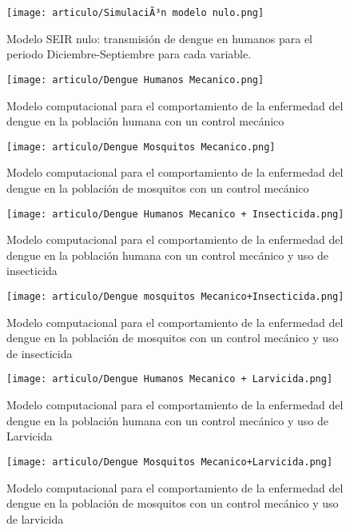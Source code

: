 \documentclass[journal]{IEEEtran}
\begin{document}

\begin{figure}[H]
\centering
\texttt{[image: articulo/SimulaciÃ³n modelo nulo.png]}
\caption{Modelo SEIR nulo: transmisión de dengue en humanos para el periodo Diciembre-Septiembre para cada variable.}
\label{fig:resultado1}
\centering
\end{figure}



\begin{figure}[h]
\texttt{[image: articulo/Dengue Humanos Mecanico.png]}
\centering 
\caption{Modelo computacional para el comportamiento de la enfermedad del dengue en la población humana con un control mecánico}
\label{3J}
\end{figure}
\begin{figure}[h]
\texttt{[image: articulo/Dengue Mosquitos Mecanico.png]}
\centering 
\caption{Modelo computacional para el comportamiento de la enfermedad del dengue en la población de mosquitos con un control mecánico}
\label{4J}
\end{figure}
\begin{figure}[h]
\texttt{[image: articulo/Dengue Humanos Mecanico + Insecticida.png]}
\centering 
\caption{Modelo computacional para el comportamiento de la enfermedad del dengue en la población humana con un control mecánico y uso de insecticida}
\label{5J}
\end{figure}
\begin{figure}[h]
\texttt{[image: articulo/Dengue mosquitos Mecanico+Insecticida.png]}
\centering 
\caption{Modelo computacional para el comportamiento de la enfermedad del dengue en la población de mosquitos con un control mecánico y uso de insecticida}
\label{6J}
\end{figure}
\begin{figure}[h]
\texttt{[image: articulo/Dengue Humanos Mecanico + Larvicida.png]}
\centering 
\caption{Modelo computacional para el comportamiento de la enfermedad del dengue en la población humana con un control mecánico y uso de Larvicida}
\label{7J}
\end{figure}
\begin{figure}[h]
\texttt{[image: articulo/Dengue Mosquitos Mecanico+Larvicida.png]}
\centering 
\caption{Modelo computacional para el comportamiento de la enfermedad del dengue en la población de mosquitos con un control mecánico y uso de larvicida}
\label{8J}
\end{figure}
\end{document}

